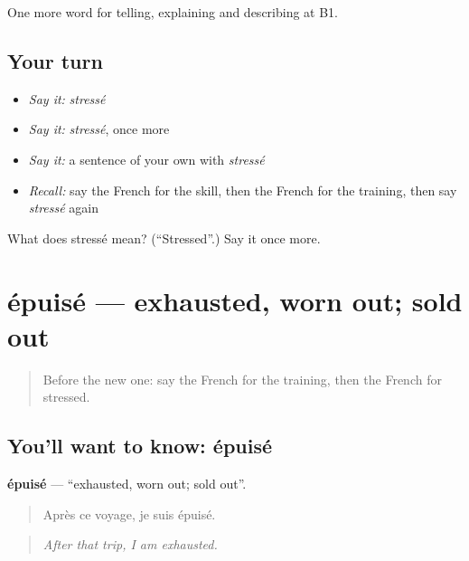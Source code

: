 \begin{grammarlens}[title={What you've built}]
One more word for telling, explaining and describing at B1.
\end{grammarlens}

\subsection*{Your turn}
\begin{itemize}
\raggedright
  \item \emph{Say it:} \emph{stressé}
  \item \emph{Say it:} \emph{stressé}, once more
  \item \emph{Say it:} a sentence of your own with \emph{stressé}
  \item \emph{Recall:} say the French for the skill, then the French for the training, then say \emph{stressé} again
\end{itemize}

\begin{tcolorbox}[breakable,colback=teal!4,colframe=teal!35!black,title={Before you move on}]
What does stressé mean? (\textquotedblleft{}Stressed\textquotedblright{}.) Say it once more.
\end{tcolorbox}
\section[épuisé]{épuisé — exhausted, worn out; sold out}

\label{lesson:FR-C361-epuise}



\begin{quote}
Before the new one: say the French for the training, then the French for stressed.
\end{quote}

\subsection*{You'll want to know: épuisé}
\textbf{épuisé} — \textquotedblleft{}exhausted, worn out; sold out\textquotedblright{}.

\begin{quote}
Après ce voyage, je suis épuisé.
\end{quote}

\begin{quote}
\emph{After that trip, I am exhausted.}
\end{quote}

